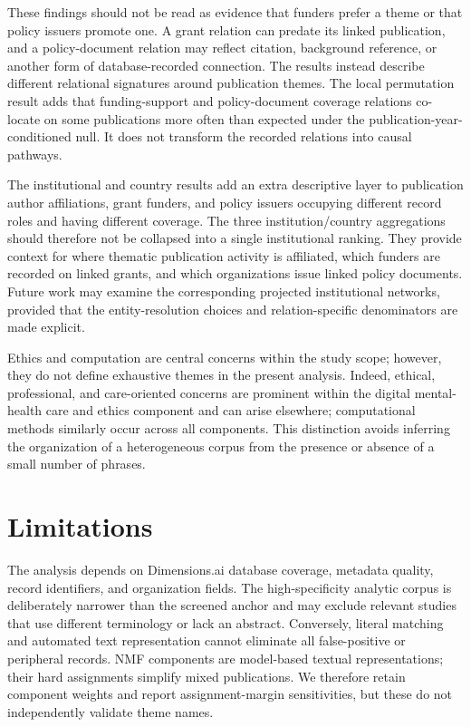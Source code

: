 \documentclass[12pt]{article}
\begin{document}
These findings should not be read as evidence that funders prefer a theme or that policy issuers promote one. A grant relation can predate its linked publication, and a policy-document relation may reflect citation, background reference, or another form of database-recorded connection. The results instead describe different relational signatures around publication themes. The local permutation result adds that funding-support and policy-document coverage relations co-locate on some publications more often than expected under the publication-year-conditioned null. It does not transform the recorded relations into causal pathways.

The institutional and country results add an extra descriptive layer to publication author affiliations, grant funders, and policy issuers occupying different record roles and having different coverage. The three institution/country aggregations should therefore not be collapsed into a single institutional ranking. They provide context for where thematic publication activity is affiliated, which funders are recorded on linked grants, and which organizations issue linked policy documents. Future work may examine the corresponding projected institutional networks, provided that the entity-resolution choices and relation-specific denominators are made explicit.

Ethics and computation are central concerns within the study scope; however, they do not define exhaustive themes in the present analysis. Indeed, ethical, professional, and care-oriented concerns are prominent within the digital mental-health care and ethics component and can arise elsewhere; computational methods similarly occur across all components. This distinction avoids inferring the organization of a heterogeneous corpus from the presence or absence of a small number of phrases.

\section{Limitations}

The analysis depends on Dimensions.ai database coverage, metadata quality, record identifiers, and organization fields. The high-specificity analytic corpus is deliberately narrower than the screened anchor and may exclude relevant studies that use different terminology or lack an abstract. Conversely, literal matching and automated text representation cannot eliminate all false-positive or peripheral records. NMF components are model-based textual representations; their hard assignments simplify mixed publications. We therefore retain component weights and report assignment-margin sensitivities, but these do not independently validate theme names.
\end{document}
